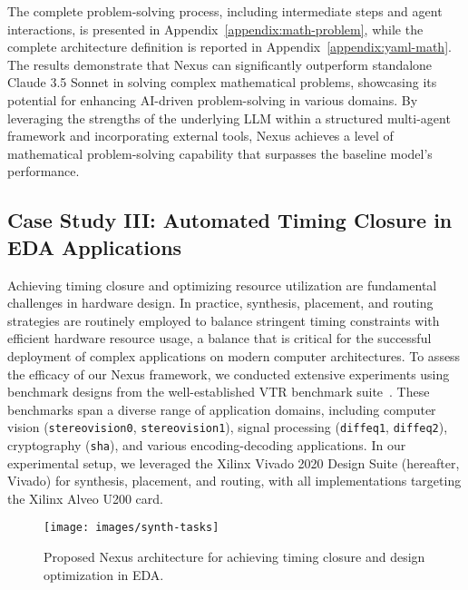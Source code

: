 The complete problem-solving process, including intermediate steps and agent interactions, is presented in Appendix~\ref{appendix:math-problem}, while the complete architecture definition is reported in Appendix~\ref{appendix:yaml-math}. The results demonstrate that Nexus can significantly outperform standalone Claude 3.5 Sonnet in solving complex mathematical problems, showcasing its potential for enhancing AI-driven problem-solving in various domains. By leveraging the strengths of the underlying LLM within a structured multi-agent framework and incorporating external tools, Nexus achieves a level of mathematical problem-solving capability that surpasses the baseline model's performance.

\subsection{Case Study III: Automated Timing Closure in EDA Applications}\label{sec:ppa}
Achieving timing closure and optimizing resource utilization are fundamental challenges in hardware design. In practice, synthesis, placement, and routing strategies are routinely employed to balance stringent timing constraints with efficient hardware resource usage, a balance that is critical for the successful deployment of complex applications on modern computer architectures. To assess the efficacy of our Nexus framework, we conducted extensive experiments using benchmark designs from the well-established VTR benchmark suite~\cite{murray2020vtr}. These benchmarks span a diverse range of application domains, including computer vision ({\tt stereovision0}, {\tt stereovision1}), signal processing ({\tt diffeq1}, {\tt diffeq2}), cryptography ({\tt sha}), and various encoding-decoding applications. In our experimental setup, we leveraged the Xilinx Vivado 2020 Design Suite (hereafter, Vivado) for synthesis, placement, and routing, with all implementations targeting the Xilinx Alveo U200 card.

\begin{figure}[h]
    \centering
    \texttt{[image: images/synth-tasks]}
    \caption{Proposed Nexus architecture for achieving timing closure and design optimization in EDA.}
    \label{fig:synth-tasks}
\end{figure}

